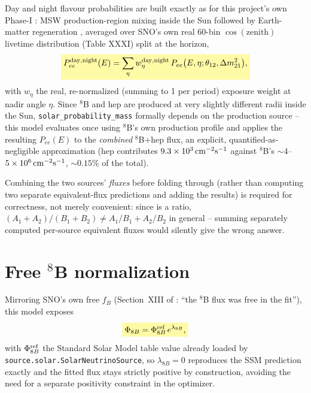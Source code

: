 
\begin{theorybox}
Day and night flavour probabilities are built exactly as for this project's
own Phase-I : MSW production-region mixing inside
the Sun \parencite{MikheyevSmirnov1985} followed by Earth-matter
regeneration \parencite{Wolfenstein1978}, averaged over SNO's own real
60-bin $\cos(\text{zenith})$ livetime distribution (Table XXXI) split at
the horizon,
\begin{equation}
  \keyresult{P_{ee}^{\rm day,night}(E) = \sum_\eta w_\eta^{\rm day,night}\,
    P_{ee}\bigl(E,\eta;\theta_{12},\Delta m^2_{21}\bigr),}
  \label{eq:daynight-average}
\end{equation}
with $w_\eta$ the real, re-normalized (summing to 1 per period) exposure
weight at nadir angle $\eta$. Since $^8$B and hep are produced at very
slightly different radii inside the Sun,
\texttt{solar\_probability\_mass} formally depends on the production
source -- this model evaluates  once using
$^8$B's own production profile and applies the resulting $P_{ee}(E)$ to
the \emph{combined} $^8$B+hep flux, an explicit, quantified-as-negligible
approximation (hep contributes $9.3\times10^3\,{\rm cm^{-2}s^{-1}}$
against $^8$B's $\sim4$--$5\times10^6\,{\rm cm^{-2}s^{-1}}$, $\sim0.15\%$
of the total).
\end{theorybox}

\begin{notebox}
Combining the two sources' \emph{fluxes} before folding through
 (rather than
computing two separate equivalent-flux predictions and adding the results)
is required for correctness, not merely convenient: since
 is a ratio,
$(A_1+A_2)/(B_1+B_2)\neq A_1/B_1+A_2/B_2$ in general -- summing separately
computed per-source equivalent fluxes would silently give the wrong answer.
\end{notebox}

\section{Free \texorpdfstring{$^8$B}{8B} normalization}
\label{sec:free-normalization}

\begin{theorybox}
Mirroring SNO's own free $f_B$ (Section~XIII of
\cite{Aharmim2005SaltPhase}: ``the $^8$B flux was free in the fit''), this
model exposes
\begin{equation}
  \keyresult{\Phi_{8B} = \Phi_{8B}^{\rm ref}\,e^{\lambda_{8B}},}
  \label{eq:free-normalization}
\end{equation}
with $\Phi_{8B}^{\rm ref}$ the Standard Solar Model table value already
loaded by \texttt{source.solar.SolarNeutrinoSource}, so $\lambda_{8B}=0$
reproduces the SSM prediction exactly and the fitted flux stays strictly
positive by construction, avoiding the need for a separate positivity
constraint in the optimizer.
\end{theorybox}

